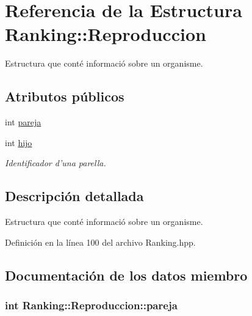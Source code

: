 \hypertarget{struct_ranking_1_1_reproduccion}{\section{Referencia de la Estructura Ranking\-:\-:Reproduccion}
\label{struct_ranking_1_1_reproduccion}
}


Estructura que conté informació sobre un organisme.  


\subsection*{Atributos públicos}
\begin{DoxyCompactItemize}
\item 
int \hyperlink{struct_ranking_1_1_reproduccion_a153d432e51d533d7fc395907f65d926e}{pareja}
\item 
int \hyperlink{struct_ranking_1_1_reproduccion_a96ddc3ebb77c33028e557ed0a87d31ab}{hijo}
\begin{DoxyCompactList}\small\item\em Identificador d'una parella. \end{DoxyCompactList}\end{DoxyCompactItemize}


\subsection{Descripción detallada}
Estructura que conté informació sobre un organisme. 

Definición en la línea 100 del archivo Ranking.\-hpp.



\subsection{Documentación de los datos miembro}
\hypertarget{struct_ranking_1_1_reproduccion_a153d432e51d533d7fc395907f65d926e}{
\subsubsection[{pareja}]{\setlength{\rightskip}{0pt plus 5cm}int Ranking\-::\-Reproduccion\-::pareja}}\label{struct_ranking_1_1_reproduccion_a153d432e51d533d7fc395907f65d926e}


